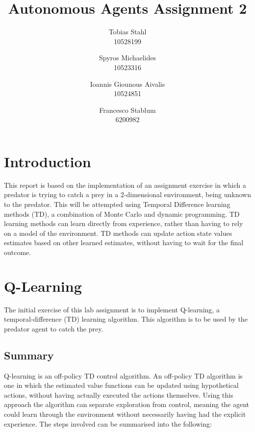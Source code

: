\documentclass[11pt]{article}
\title{
	\textbf{Autonomous Agents Assignment 2}
}
\author{Tobias Stahl \\ 10528199 \and Spyros Michaelides \\ 10523316 \and Ioannis Giounous Aivalis \\ 10524851 \and Francesco Stablum \\ 6200982}
\begin{document}
\maketitle




\section{Introduction}
This report is based on the implementation of an assignment exercise in which a predator is trying to catch a prey in a 2-dimensional environment, being unknown to the predator. This will be attempted  using Temporal Difference learning methods (TD), a combination of Monte Carlo and dynamic programming. TD learning methods can learn directly from experience, rather than having to rely on a model of the environment. TD methods can update action state values estimates based on other learned estimates, without having to wait for the final outcome. 


\section{Q-Learning}
The initial exercise of this lab assignment is to implement Q-learning, a temporal-difference (TD) learning algorithm. This algorithm is to be used by the predator agent to catch the prey.



\subsection{Summary}
Q-learning is an off-policy TD control algorithm. An off-policy TD algorithm is one in which the estimated value functions can be updated using hypothetical actions, without having actually executed the actions themselves. Using this approach the algorithm can separate exploration from control, meaning the agent could learn through the environment without necessarily having had the explicit experience.
The steps involved can be summarised into the following:\\\\

\pagebreak
\end{document}
